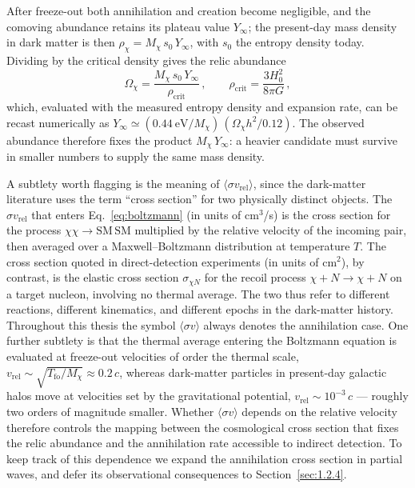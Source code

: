 After freeze-out both annihilation and creation become negligible, and the comoving abundance retains its plateau value $Y_\infty$; the present-day mass density in dark matter is then $\rho_\chi = M_\chi\, s_0\, Y_\infty$, with $s_0$ the entropy density today.
Dividing by the critical density gives the relic abundance
\begin{equation}
	\Omega_\chi = \frac{M_\chi\, s_0\, Y_\infty}{\rho_\mathrm{crit}}\,, \qquad \rho_\mathrm{crit} = \frac{3 H_0^2}{8\pi G}\,,
	\label{eq:omega_Y}
\end{equation}
which, evaluated with the measured entropy density and expansion rate, can be recast numerically as $Y_\infty \simeq (0.44~\mathrm{eV}/M_\chi)\,(\Omega_\chi h^2/0.12)$.
The observed abundance therefore fixes the product $M_\chi\, Y_\infty$: a heavier candidate must survive in smaller numbers to supply the same mass density.

A subtlety worth flagging is the meaning of $\langle \sigma v_\mathrm{rel}\rangle$, since the dark-matter literature uses the term ``cross section'' for two physically distinct objects.
The $\sigma v_\mathrm{rel}$ that enters Eq.~\eqref{eq:boltzmann} (in units of cm$^3$/s) is the cross section for the process $\chi\chi \to \mathrm{SM}\,\mathrm{SM}$ multiplied by the relative velocity of the incoming pair, then averaged over a Maxwell--Boltzmann distribution at temperature $T$.
The cross section quoted in direct-detection experiments (in units of cm$^2$), by contrast, is the elastic cross section $\sigma_{\chi N}$ for the recoil process $\chi + N \to \chi + N$ on a target nucleon, involving no thermal average.
The two thus refer to different reactions, different kinematics, and different epochs in the dark-matter history.
Throughout this thesis the symbol $\langle \sigma v\rangle$ always denotes the annihilation case.
One further subtlety is that the thermal average entering the Boltzmann equation is evaluated at freeze-out velocities of order the thermal scale, $v_\mathrm{rel} \sim \sqrt{T_\mathrm{fo}/M_\chi} \approx 0.2\,c$, whereas dark-matter particles in present-day galactic halos move at velocities set by the gravitational potential, $v_\mathrm{rel} \sim 10^{-3}\,c$ --- roughly two orders of magnitude smaller.
Whether $\langle \sigma v \rangle$ depends on the relative velocity therefore controls the mapping between the cosmological cross section that fixes the relic abundance and the annihilation rate accessible to indirect detection.
To keep track of this dependence we expand the annihilation cross section in partial waves, and defer its observational consequences to Section~\ref{sec:1.2.4}.

